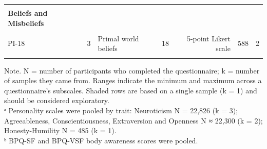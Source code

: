 \begin{table}
\begin{tabular*}{\linewidth}{@{\extracolsep{\fill}}lrlrrcc}
{\cellcolor[HTML]{FFF8E1}{AQ-50}} & {\cellcolor[HTML]{FFF8E1}{1}} & {\cellcolor[HTML]{FFF8E1}{Autistic traits (total score)}} & {\cellcolor[HTML]{FFF8E1}{50}} & {\cellcolor[HTML]{FFF8E1}{4-point Likert scale}} & {\cellcolor[HTML]{FFF8E1}{104}} & {\cellcolor[HTML]{FFF8E1}{1}} \\ 
{\bfseries Beliefs and Misbeliefs} &  &  &  &  &  &  \\ 
{\cellcolor[HTML]{FFF8E1}{GCBS}} & {\cellcolor[HTML]{FFF8E1}{5}} & {\cellcolor[HTML]{FFF8E1}{Conspiracy beliefs}} & {\cellcolor[HTML]{FFF8E1}{15}} & {\cellcolor[HTML]{FFF8E1}{5-point Likert scale}} & {\cellcolor[HTML]{FFF8E1}{485}} & {\cellcolor[HTML]{FFF8E1}{1}} \\ 
PI-18 & 3 & Primal world beliefs & 18 & 5-point Likert scale & 588 & 2 \\ 
{\cellcolor[HTML]{FFF8E1}{LIE scale}} & {\cellcolor[HTML]{FFF8E1}{4}} & {\cellcolor[HTML]{FFF8E1}{Lying tendencies}} & {\cellcolor[HTML]{FFF8E1}{16}} & {\cellcolor[HTML]{FFF8E1}{Visual analogue scales}} & {\cellcolor[HTML]{FFF8E1}{485}} & {\cellcolor[HTML]{FFF8E1}{1}} \\ 
\bottomrule
\end{tabular*}
\begin{minipage}{\linewidth}
\vspace{.05em}
Note. N = number of participants who completed the questionnaire; k = number of samples they came from. Ranges indicate the minimum and maximum across a questionnaire's subscales. Shaded rows are based on a single sample (k = 1) and should be considered exploratory.\\
ᵃ Personality scales were pooled by trait: Neuroticism N = 22,826 (k = 3); Agreeableness, Conscientiousness, Extraversion and Openness N ≈ 22,300 (k = 2); Honesty-Humility N = 485 (k = 1).\\
ᵇ BPQ-SF and BPQ-VSF body awareness scores were pooled.\\
\end{minipage}
\end{table}

